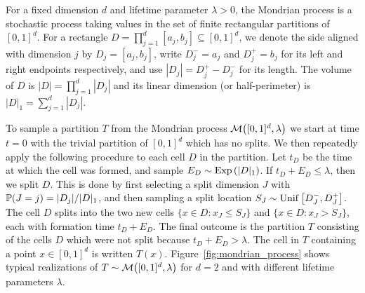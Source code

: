 For a fixed dimension $d$ and lifetime parameter $\lambda > 0$, the Mondrian
process is a stochastic process taking values in the set of finite rectangular
partitions of $[0,1]^d$. For a rectangle
$D = \prod_{j=1}^d [a_j, b_j] \subseteq [0,1]^d$,
we denote the side aligned with dimension $j$ by $D_j = [a_j, b_j]$, write
$D_j^- = a_j$ and $D_j^+ = b_j$ for its left and right endpoints respectively,
and use $|D_j| = D_j^+ - D_j^-$ for its length. The volume of $D$ is
$|D| = \prod_{j=1}^{d} |D_j|$ and its linear dimension (or half-perimeter) is
$|D|_1 = \sum_{j=1}^{d} |D_j|$.

To sample a partition $T$ from the Mondrian process
$\cM \big( [0,1]^d, \lambda \big)$ we start at time $t=0$ with the trivial
partition of $[0,1]^d$ which has no splits. We then repeatedly apply the
following procedure to each cell $D$ in the partition. Let $t_D$ be the time at
which the cell was formed, and sample $E_D \sim \Exp \left( |D|_1 \right)$. If
$t_D + E_D \leq \lambda$, then we split $D$. This is done by first selecting a
split dimension $J$ with $\P(J=j) = |D_j| / |D|_1$, and then sampling a split
location $S_J \sim \Unif\big[D_J^-, D_J^+\big]$. The cell $D$ splits into the
two new cells $\{x \in D : x_J \leq S_J\}$ and $\{x \in D : x_J > S_J\}$, each
with formation time $t_D + E_D$. The final outcome is the partition $T$
consisting of the cells $D$ which were not split because $t_D + E_D > \lambda$.
The cell in $T$ containing a point $x \in [0,1]^d$ is written $T(x)$.
Figure~\ref{fig:mondrian_process} shows typical realizations of
$T \sim \cM\big( [0,1]^d, \lambda \big)$ for $d=2$ and with different lifetime
parameters $\lambda$.
%
